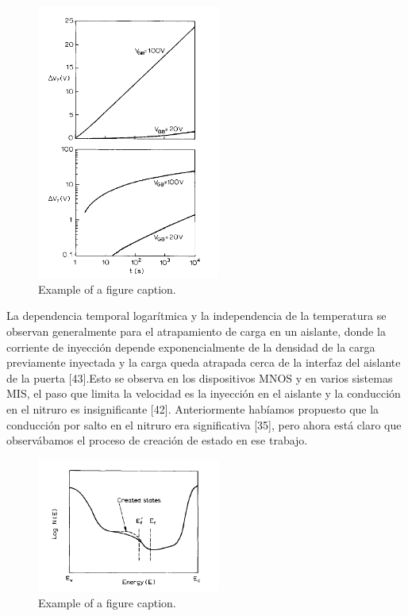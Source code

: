 \documentclass[conference]{IEEEtran}
\begin{document}
\begin{figure}[htbp]
    \centerline{\includegraphics[width=6.0cm]{img/imagen-14.png}}
    \caption{Example of a figure caption.}%
    \label{fig14}
\end{figure} 
    
    La dependencia temporal logarítmica y la independencia de la temperatura se observan generalmente 
    para el atrapamiento de carga en un aislante, donde la corriente de inyección depende 
    exponencialmente de la densidad de la carga previamente inyectada y la carga queda atrapada 
    cerca de la interfaz del aislante de la puerta [43].Esto se observa en los dispositivos MNOS y 
    en varios sistemas MIS, el paso que limita la velocidad es la inyección en el aislante y la 
    conducción en el nitruro es insignificante [42]. Anteriormente habíamos propuesto que la 
    conducción por salto en el nitruro era significativa [35], pero ahora está claro que observábamos 
    el proceso de creación de estado en ese trabajo.

\begin{figure}[htbp]
    \centerline{\includegraphics[width=6.0cm]{img/imagen-15.png}}
    \caption{Example of a figure caption.}%
    \label{fig15}
\end{figure} 
    
\end{document}
